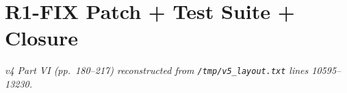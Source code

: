 \part{R1-FIX Patch + Test Suite + Closure}
\noindent\textit{v4 Part VI (pp.~180--217) reconstructed from
\texttt{/tmp/v5\_layout.txt} lines 10595--13230.}






